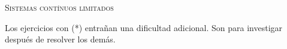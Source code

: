 \documentclass[11pt, spanish, a4paper, twopage]{article}
\begin{document}
\begin{center}
	\textsc{\LARGE Sistemas contínuos limitados}
\end{center}


Los ejercicios con (*) entrañan una dificultad adicional. Son para investigar después de resolver los demás.


\begin{enumerate}






\end{enumerate}
\end{document}
